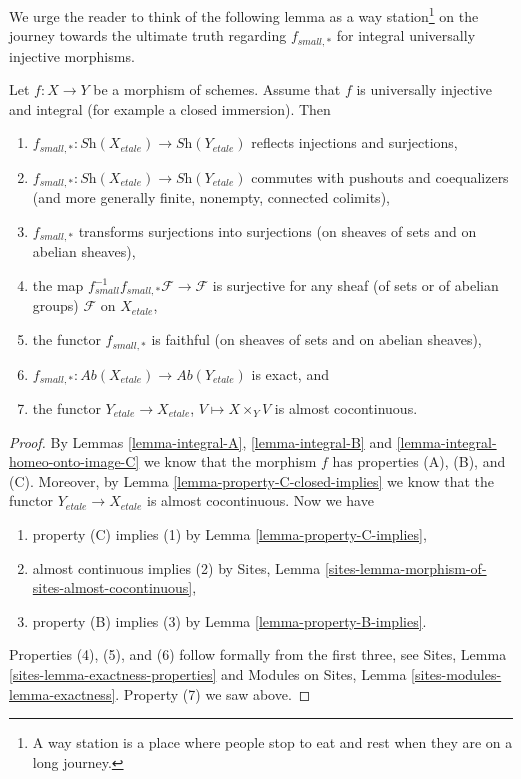 \noindent
We urge the reader to think of the following lemma as a
way station\footnote{A way station is a place where people stop to eat
and rest when they are on a long journey.} on the journey towards the
ultimate truth regarding $f_{small, *}$ for integral universally injective
morphisms.

\begin{lemma}
\label{lemma-integral-universally-injective}
Let $f : X \to Y$ be a morphism of schemes. Assume that $f$ is
universally injective and integral (for example a closed immersion).
Then
\begin{enumerate}
\item $f_{small, *} : \textit{Sh}(X_{etale}) \to \textit{Sh}(Y_{etale})$
reflects injections and surjections,
\item $f_{small, *} : \textit{Sh}(X_{etale}) \to \textit{Sh}(Y_{etale})$
commutes with pushouts and coequalizers (and more generally
finite, nonempty, connected colimits),
\item $f_{small, *}$ transforms surjections into surjections (on sheaves
of sets and on abelian sheaves),
\item the map
$f_{small}^{-1}f_{small, *}\mathcal{F} \to \mathcal{F}$
is surjective for any sheaf (of sets or of abelian groups)
$\mathcal{F}$ on $X_{etale}$,
\item the functor $f_{small, *}$ is faithful (on sheaves of sets and
on abelian sheaves),
\item $f_{small, *} : \textit{Ab}(X_{etale}) \to \textit{Ab}(Y_{etale})$
is exact, and
\item the functor $Y_{etale} \to X_{etale}$, $V \mapsto X \times_Y V$ is
almost cocontinuous.
\end{enumerate}
\end{lemma}

\begin{proof}
By
Lemmas \ref{lemma-integral-A},
\ref{lemma-integral-B} and
\ref{lemma-integral-homeo-onto-image-C}
we know that the morphism $f$ has properties (A), (B), and (C).
Moreover, by
Lemma \ref{lemma-property-C-closed-implies}
we know that the functor $Y_{etale} \to X_{etale}$ is
almost cocontinuous. Now we have
\begin{enumerate}
\item property (C) implies (1) by
Lemma \ref{lemma-property-C-implies},
\item almost continuous implies (2) by
Sites, Lemma \ref{sites-lemma-morphism-of-sites-almost-cocontinuous},
\item property (B) implies (3) by
Lemma \ref{lemma-property-B-implies}.
\end{enumerate}
Properties (4), (5), and (6) follow formally from the first three, see
Sites, Lemma \ref{sites-lemma-exactness-properties}
and
Modules on Sites, Lemma \ref{sites-modules-lemma-exactness}.
Property (7) we saw above.
\end{proof}




